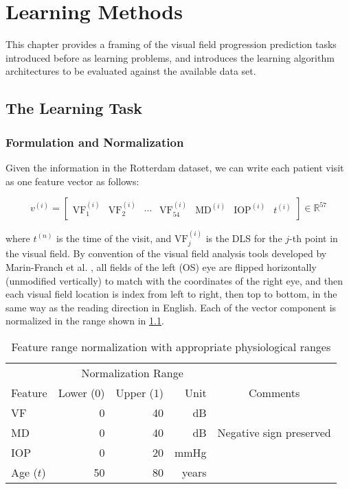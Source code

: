 \chapter{Learning Methods}

This chapter provides a framing of the visual field progression prediction tasks introduced before as learning problems, and introduces the learning algorithm architectures to be evaluated against the available data set. 

\section{The Learning Task}

\subsection{Formulation and Normalization}

Given the information in the Rotterdam dataset, we can write each patient visit as one feature vector as follows:

\begin{equation}
v^{(i)} = \begin{bmatrix}
\textrm{VF}^{(i)}_1 & 
\textrm{VF}^{(i)}_2 & 
\cdots & 
\textrm{VF}^{(i)}_{54} & 
\textrm{MD}^{(i)} & 
\textrm{IOP}^{(i)} & 
t^{(i)}
\end{bmatrix}
\in \mathbb{R}^{57}
\end{equation}

where $t^{(n)}$ is the time of the visit, and $\textrm{VF}^{(i)}_j$ is the \ac{DLS} for the $j$-th point in the visual field. By convention of the visual field analysis tools developed by Marin-Franch et al. \cite{Marin-Franch2013}, all fields of the left (OS) eye are flipped horizontally (unmodified vertically) to match with the coordinates of the right eye, and then each visual field location is index from left to right, then top to bottom, in the same way as the reading direction in English. Each of the vector component is normalized in the range shown in \cref{tab:norm}.

\begin{table}[h]
\centering
\caption{Feature range normalization with appropriate physiological ranges}
\begin{tabular}{@{}lrrrc@{}}
\toprule
 & \multicolumn{3}{c}{Normalization Range} & \\
\cmidrule{2-4}
Feature & Lower (0) & Upper (1) & Unit & Comments \\ 
\midrule
VF & 0 & 40 & dB &  \\
MD & 0 & 40 & dB & Negative sign preserved \\
IOP & 0 & 20 & mmHg &  \\
Age ($t$) & 50 & 80 & years &  \\ 
\bottomrule
\end{tabular}
\label{tab:norm}
\end{table}

